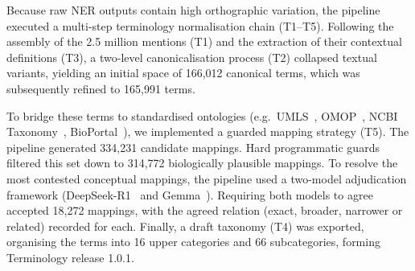 \documentclass[referee,lineno,pdflatex,sn-vancouver-num]{sn-jnl}
\theoremstyle{thmstyleone}%
\theoremstyle{thmstyletwo}%
\theoremstyle{thmstylethree}%
\begin{document}

Because raw NER outputs contain high orthographic variation, the pipeline
executed a multi-step terminology normalisation chain (T1--T5). Following
the assembly of the 2.5 million mentions (T1) and the extraction of their
contextual definitions (T3), a two-level canonicalisation process (T2)
collapsed textual variants, yielding an initial space of 166,012 canonical
terms, which was subsequently refined to 165,991 terms.

To bridge these terms to standardised ontologies (e.g.\
UMLS~\cite{bodenreider2004umls}, OMOP~\cite{hripcsak2015ohdsi}, NCBI
Taxonomy~\cite{schoch2020taxonomy}, BioPortal~\cite{whetzel2011bioportal}),
we implemented a guarded mapping strategy (T5). The pipeline generated
334,231 candidate mappings. Hard programmatic guards filtered this set
down to 314,772 biologically plausible mappings. To resolve the most
contested conceptual mappings, the pipeline used a two-model adjudication
framework (DeepSeek-R1~\cite{guo2025deepseekr1} and
Gemma~\cite{gemma2026gemma4}). Requiring both models to agree accepted
18,272 mappings, with the agreed relation (exact, broader, narrower or related)
recorded for each. Finally, a draft taxonomy
(T4) was exported, organising the terms into 16 upper categories and 66
subcategories, forming Terminology release 1.0.1.
\end{document}

